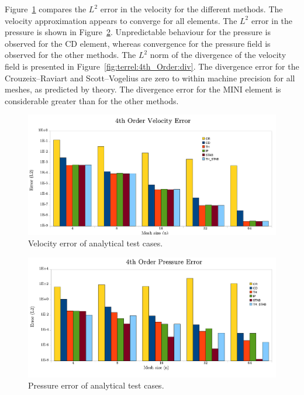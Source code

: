 Figure~\ref{fig:terrel:4th_Order:vel} compares the $L^{2}$ error in
the velocity for the different methods. The velocity approximation
appears to converge for all elements.  The $L^{2}$ error in the pressure
is shown in Figure~\ref{fig:terrel:4th_Order:press}.  Unpredictable
behaviour for the pressure is observed for the CD element, whereas
convergence for the pressure field is observed for the other methods.
The $L^{2}$ norm of the divergence of the velocity field is presented
in Figure~\ref{fig:terrel:4th_Order:div}.  The divergence error for
the Crouzeix--Raviart and Scott--Vogelius are zero to within machine
precision for all meshes, as predicted by theory. The divergence error
for the MINI element is considerable greater than for the other methods.

\begin{figure}
  \center\includegraphics[width=\largefig]{chapters/terrel/pdf/vel_4.pdf}
  \caption{Velocity error of analytical test cases.}
    \label{fig:terrel:4th_Order:vel}
\end{figure}

\begin{figure}
  \center \includegraphics[width=\largefig]{chapters/terrel/pdf/press_4.pdf}
  \caption{Pressure error of analytical test cases.}
  \label{fig:terrel:4th_Order:press}
\end{figure}

